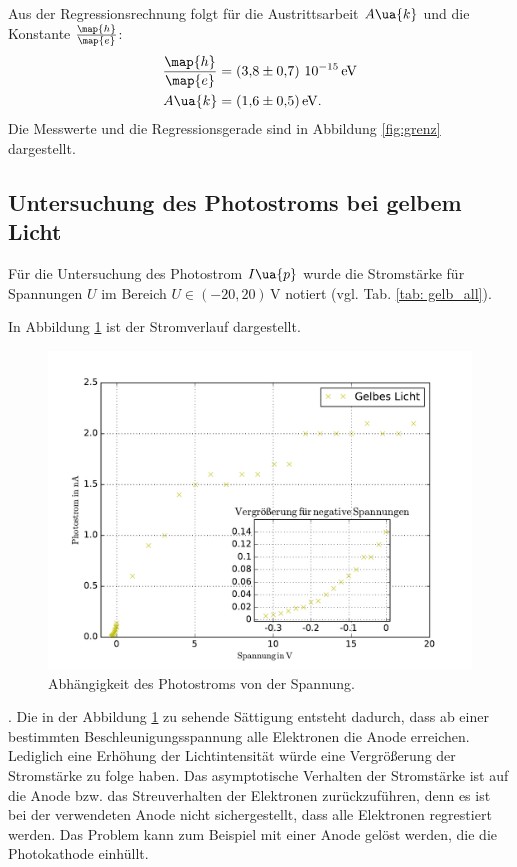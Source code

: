 Aus der Regressionsrechnung folgt für die Austrittsarbeit $A\ua{k}$ und die
Konstante $\frac{\map{h}}{\map{e}}$:
\begin{align}
  \label{eq:messergebnisse}
  \begin{aligned}
  \frac{\map{h}}{\map{e}}&= \left(\num{3.8\pm 0.7}\right)\,\num{e-15}\,\si{\eV} \\
  A\ua{k}&=\SI{1.6\pm 0.5}{\eV}.
  \end{aligned}
\end{align}
Die Messwerte und die Regressionsgerade sind in Abbildung \ref{fig:grenz} dargestellt.
\subsection{Untersuchung des Photostroms bei gelbem Licht}
Für die Untersuchung des Photostrom $I\ua{p}$ wurde die
Stromstärke für Spannungen $U$ im Bereich $U\in\left(-20,20\right)\,\si{\volt}$
notiert (vgl. Tab. \ref{tab: gelb_all}).

In Abbildung \ref{fig:gelb_all} ist der Stromverlauf dargestellt.
\begin{figure}
    \centering
    \includegraphics[width=1 \textwidth]{../Messdaten/gelb.pdf}
    \caption{Abhängigkeit des Photostroms von der Spannung.}
    \label{fig:gelb_all}
  \end{figure}.
Die in der Abbildung \ref{fig:gelb_all} zu sehende Sättigung entsteht dadurch, dass
ab einer bestimmten Beschleunigungsspannung alle Elektronen die Anode erreichen.
Lediglich eine Erhöhung der Lichtintensität würde eine Vergrößerung der Stromstärke
zu folge haben. %
Das asymptotische Verhalten der Stromstärke ist auf die Anode
bzw. das Streuverhalten der Elektronen zurückzuführen, denn es ist bei der verwendeten %
Anode nicht sichergestellt, dass alle Elektronen regrestiert werden. %
Das Problem kann zum Beispiel mit einer Anode gelöst werden, die die Photokathode
einhüllt.

